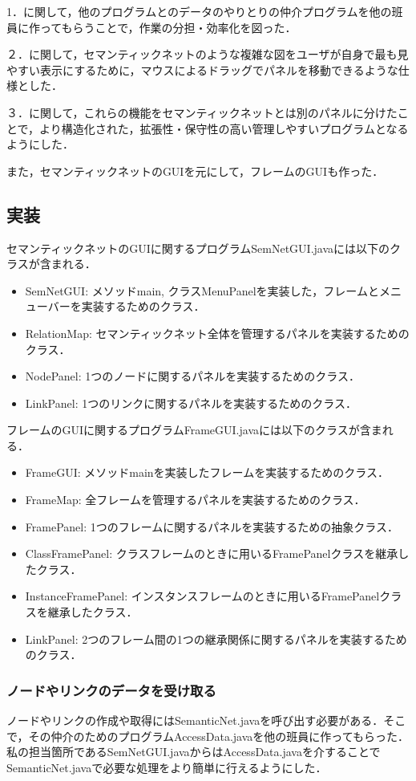 \documentclass[12pt]{jarticle}
\begin{document}
1．に関して，他のプログラムとのデータのやりとりの仲介プログラムを他の班員に作ってもらうことで，作業の分担・効率化を図った．

２．に関して，セマンティックネットのような複雑な図をユーザが自身で最も見やすい表示にするために，マウスによるドラッグでパネルを移動できるような仕様とした．

３．に関して，これらの機能をセマンティックネットとは別のパネルに分けたことで，より構造化された，拡張性・保守性の高い管理しやすいプログラムとなるようにした．

また，セマンティックネットのGUIを元にして，フレームのGUIも作った．

\clearpage

\subsection{実装}
セマンティックネットのGUIに関するプログラムSemNetGUI.javaには以下のクラスが含まれる．
\begin{itemize}
\item SemNetGUI: メソッドmain, クラスMenuPanelを実装した，フレームとメニューバーを実装するためのクラス．
\item RelationMap: セマンティックネット全体を管理するパネルを実装するためのクラス．
\item NodePanel: 1つのノードに関するパネルを実装するためのクラス．
\item LinkPanel: 1つのリンクに関するパネルを実装するためのクラス．
\end{itemize}

フレームのGUIに関するプログラムFrameGUI.javaには以下のクラスが含まれる．
\begin{itemize}
\item FrameGUI: メソッドmainを実装したフレームを実装するためのクラス．
\item FrameMap: 全フレームを管理するパネルを実装するためのクラス．
\item FramePanel: 1つのフレームに関するパネルを実装するための抽象クラス．
\item ClassFramePanel: クラスフレームのときに用いるFramePanelクラスを継承したクラス．
\item InstanceFramePanel: インスタンスフレームのときに用いるFramePanelクラスを継承したクラス．
\item LinkPanel: 2つのフレーム間の1つの継承関係に関するパネルを実装するためのクラス．
\end{itemize}

\subsubsection{ノードやリンクのデータを受け取る}
ノードやリンクの作成や取得にはSemanticNet.javaを呼び出す必要がある．そこで，その仲介のためのプログラムAccessData.javaを他の班員に作ってもらった．私の担当箇所であるSemNetGUI.javaからはAccessData.javaを介することでSemanticNet.javaで必要な処理をより簡単に行えるようにした．
\end{document}
